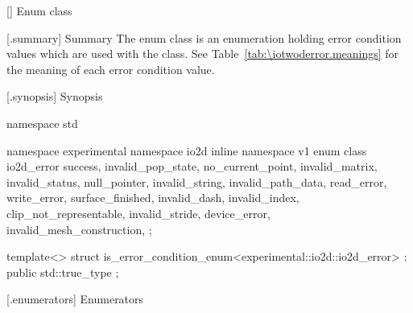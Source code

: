  [\iotwoderror] {Enum class }

 [\iotwoderror.summary] { Summary}
\pnum
The  enum class is an enumeration holding error condition values which are used with the  class. See 
Table~\ref{tab:\iotwoderror.meanings} for the meaning of each
error condition value.

 [\iotwoderror.synopsis] { Synopsis}

\begin{codeblock}
namespace std { namespace experimental { namespace io2d { inline namespace v1 {
  enum class io2d_error {
    success,
    invalid_pop_state,
    no_current_point,
    invalid_matrix,
    invalid_status,
    null_pointer,
    invalid_string,
    invalid_path_data,
    read_error,
    write_error,
    surface_finished,
    invalid_dash,
    invalid_index,
    clip_not_representable,
    invalid_stride,
    device_error,
    invalid_mesh_construction,
  };
} } }

  template<>
  struct is_error_condition_enum<experimental::io2d::io2d_error>
  : public std::true_type{ };
}
\end{codeblock}

 [\iotwoderror.enumerators] { Enumerators}


